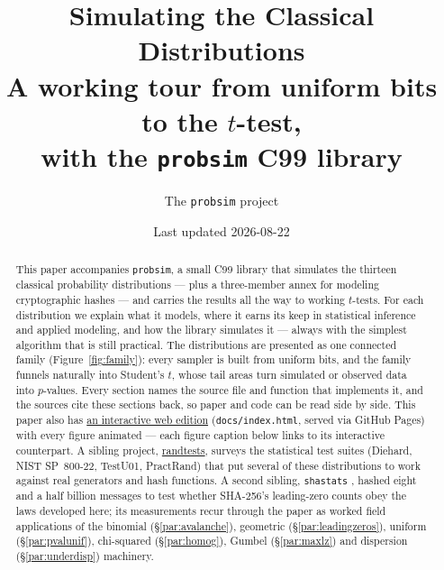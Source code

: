 \documentclass[11pt]{article}
\title{\textbf{Simulating the Classical Distributions}\\[2pt]
       \large A working tour from uniform bits to the $t$-test,\\
       with the \texttt{probsim} C99 library}
\author{The \texttt{probsim} project}
\date{Last updated 2026-08-22}
\numberwithin{equation}{section}
\newcommand{\siteurl}{https://sanya-shopper.github.io/distribs/}
\newcommand{\sisterurl}{https://sanya-shopper.github.io/randtests/}
\begin{document}
\maketitle

\begin{abstract}
\noindent
This paper accompanies \texttt{probsim}, a small C99 library that simulates
the thirteen classical probability distributions --- plus a three-member
annex for modeling cryptographic hashes --- and carries the results all
the way to working $t$-tests.  For each distribution we explain what it
models, where it earns its keep in statistical inference and applied
modeling, and how the library simulates it --- always with the simplest
algorithm that is still practical.  The distributions are presented as one
connected family (Figure~\ref{fig:family}): every sampler is built from
uniform bits, and the family funnels naturally into Student's $t$, whose
tail areas turn simulated or observed data into $p$-values.  Every section
names the source file and function that implements it, and the sources cite
these sections back, so paper and code can be read side by side.  This
paper also has \href{\siteurl}{an interactive web edition}
(\texttt{docs/index.html}, served via GitHub Pages) with every figure
animated --- each figure caption below links to its interactive
counterpart.  A sibling project, \href{\sisterurl}{randtests}, surveys
the statistical test suites (Diehard, NIST SP~800-22, TestU01, PractRand)
that put several of these distributions to work against real generators
and hash functions.  A second sibling, \texttt{shastats}
\citep{shastats2026}, hashed eight and a half billion messages to test
whether SHA-256's leading-zero counts obey the laws developed here; its
measurements recur through the paper as worked field applications of the
binomial (\S\ref{par:avalanche}), geometric (\S\ref{par:leadingzeros}),
uniform (\S\ref{par:pvalunif}), chi-squared (\S\ref{par:homog}), Gumbel
(\S\ref{par:maxlz}) and dispersion (\S\ref{par:underdisp}) machinery.
\end{abstract}
\end{document}

